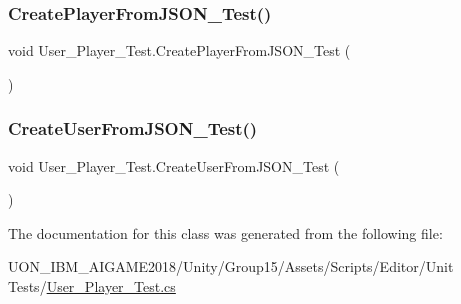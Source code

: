 \mbox{\label{class_user___player___test_a1b00d27b0e5bb67f63d0ee46ed39b0f0}} 
\subsubsection{\texorpdfstring{CreatePlayerFromJSON\_Test()}{CreatePlayerFromJSON\_Test()}}
{\footnotesize\ttfamily void User\+\_\+\+Player\+\_\+\+Test.\+Create\+Player\+From\+J\+S\+O\+N\+\_\+\+Test (\begin{DoxyParamCaption}{ }\end{DoxyParamCaption})\hspace{0.3cm}{\ttfamily [inline]}}

\mbox{\label{class_user___player___test_a45e8193156cae6d3615b54d257738662}} 
\subsubsection{\texorpdfstring{CreateUserFromJSON\_Test()}{CreateUserFromJSON\_Test()}}
{\footnotesize\ttfamily void User\+\_\+\+Player\+\_\+\+Test.\+Create\+User\+From\+J\+S\+O\+N\+\_\+\+Test (\begin{DoxyParamCaption}{ }\end{DoxyParamCaption})\hspace{0.3cm}{\ttfamily [inline]}}



The documentation for this class was generated from the following file\+:\begin{DoxyCompactItemize}
\item 
U\+O\+N\+\_\+\+I\+B\+M\+\_\+\+A\+I\+G\+A\+M\+E2018/\+Unity/\+Group15/\+Assets/\+Scripts/\+Editor/\+Unit Tests/\mbox{\hyperlink{_user___player___test_8cs}{User\+\_\+\+Player\+\_\+\+Test.\+cs}}\end{DoxyCompactItemize}
